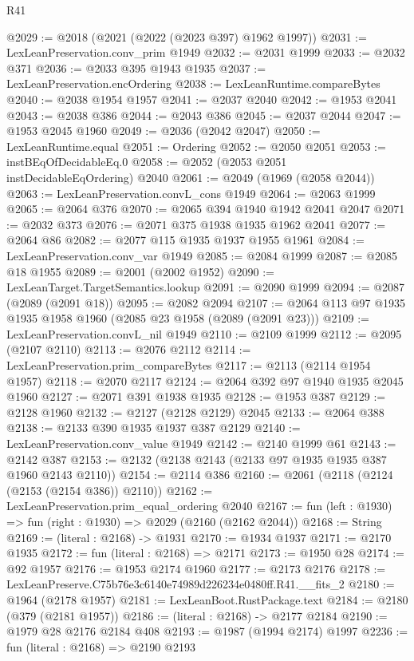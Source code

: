 \begin{lexlean}{R41}
\begin{coremodule}
@2029 := @2018 (@2021 (@2022 (@2023 @397) @1962 @1997))
@2031 := LexLeanPreservation.conv_prim @1949
@2032 := @2031 @1999
@2033 := @2032 @371
@2036 := @2033 @395 @1943 @1935
@2037 := LexLeanPreservation.encOrdering
@2038 := LexLeanRuntime.compareBytes
@2040 := @2038 @1954 @1957
@2041 := @2037 @2040
@2042 := @1953 @2041
@2043 := @2038 @386
@2044 := @2043 @386
@2045 := @2037 @2044
@2047 := @1953 @2045 @1960
@2049 := @2036 (@2042 @2047)
@2050 := LexLeanRuntime.equal
@2051 := Ordering
@2052 := @2050 @2051
@2053 := instBEqOfDecidableEq.{0}
@2058 := @2052 (@2053 @2051 instDecidableEqOrdering) @2040
@2061 := @2049 (@1969 (@2058 @2044))
@2063 := LexLeanPreservation.convL_cons @1949
@2064 := @2063 @1999
@2065 := @2064 @376
@2070 := @2065 @394 @1940 @1942 @2041 @2047
@2071 := @2032 @373
@2076 := @2071 @375 @1938 @1935 @1962 @2041
@2077 := @2064 @86
@2082 := @2077 @115 @1935 @1937 @1955 @1961
@2084 := LexLeanPreservation.conv_var @1949
@2085 := @2084 @1999
@2087 := @2085 @18 @1955
@2089 := @2001 (@2002 @1952)
@2090 := LexLeanTarget.TargetSemantics.lookup
@2091 := @2090 @1999
@2094 := @2087 (@2089 (@2091 @18))
@2095 := @2082 @2094
@2107 := @2064 @113 @97 @1935 @1935 @1958 @1960 (@2085 @23 @1958 (@2089 (@2091 @23)))
@2109 := LexLeanPreservation.convL_nil @1949
@2110 := @2109 @1999
@2112 := @2095 (@2107 @2110)
@2113 := @2076 @2112
@2114 := LexLeanPreservation.prim_compareBytes
@2117 := @2113 (@2114 @1954 @1957)
@2118 := @2070 @2117
@2124 := @2064 @392 @97 @1940 @1935 @2045 @1960
@2127 := @2071 @391 @1938 @1935
@2128 := @1953 @387
@2129 := @2128 @1960
@2132 := @2127 (@2128 @2129) @2045
@2133 := @2064 @388
@2138 := @2133 @390 @1935 @1937 @387 @2129
@2140 := LexLeanPreservation.conv_value @1949
@2142 := @2140 @1999 @61
@2143 := @2142 @387
@2153 := @2132 (@2138 @2143 (@2133 @97 @1935 @1935 @387 @1960 @2143 @2110))
@2154 := @2114 @386
@2160 := @2061 (@2118 (@2124 (@2153 (@2154 @386)) @2110))
@2162 := LexLeanPreservation.prim_equal_ordering @2040
@2167 := fun (left : @1930) => fun (right : @1930) => @2029 (@2160 (@2162 @2044))
@2168 := String
@2169 := (literal : @2168) -> @1931
@2170 := @1934 @1937
@2171 := @2170 @1935
@2172 := fun (literal : @2168) => @2171
@2173 := @1950 @28
@2174 := @92 @1957
@2176 := @1953 @2174 @1960
@2177 := @2173 @2176
@2178 := LexLeanPreserve.C75b76e3c6140e74989d226234e0480ff.R41.__fits_2
@2180 := @1964 (@2178 @1957)
@2181 := LexLeanBoot.RustPackage.text
@2184 := @2180 (@379 (@2181 @1957))
@2186 := (literal : @2168) -> @2177 @2184
@2190 := @1979 @28 @2176 @2184 @408
@2193 := @1987 (@1994 @2174) @1997
@2236 := fun (literal : @2168) =>
  @2190
    @2193

\end{coremodule}
\end{lexlean}
